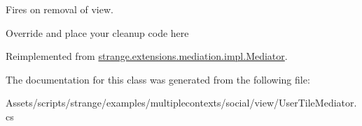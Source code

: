 Fires on removal of view. 

Override and place your cleanup code here 

Reimplemented from \hyperlink{classstrange_1_1extensions_1_1mediation_1_1impl_1_1_mediator_a9c65534ae8c37db9f4db7c84a94cd635}{strange.\-extensions.\-mediation.\-impl.\-Mediator}.



The documentation for this class was generated from the following file\-:\begin{DoxyCompactItemize}
\item 
Assets/scripts/strange/examples/multiplecontexts/social/view/User\-Tile\-Mediator.\-cs\end{DoxyCompactItemize}
